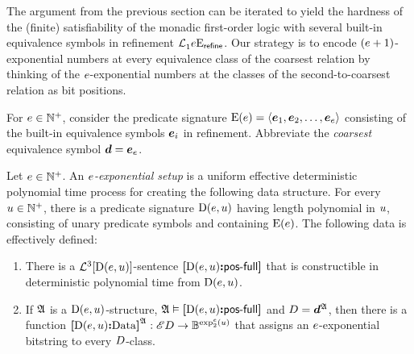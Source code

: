 The argument from the previous section can be iterated to yield the hardness of
the (finite) satisfiability of the monadic first-order logic with several
built-in equivalence symbols in refinement $\mathcal{L}^{{}}_{1}{e}\mathrm{E}_{\mathsf{refine}}$.
Our strategy is to encode $(e+1)$-exponential numbers at every equivalence
class of the coarsest relation by thinking of the $e$-exponential numbers at
the classes of the second-to-coarsest relation as bit positions.

 For $e \in \mathbb{N}^{+}$, consider the predicate
signature ${\mathrm{E}}(e) = \left\langle \bm{e}_{1},\bm{e}_{2},\dots,\bm{e}_{e} \right\rangle$ consisting of the built-in equivalence
symbols $\bm{e}_{i}$ in refinement. Abbreviate the \emph{coarsest} equivalence 
symbol $\bm{d} = \bm{e}_{e}$.
\begin{definition}
Let $e \in \mathbb{N}^{+}$. An \emph{$e$-exponential setup} is a uniform
effective deterministic polynomial time process for creating the following data
structure.
For every $u \in \mathbb{N}^{+}$, there is a predicate signature ${\mathrm{D}}(e,u)$
having length polynomial in $u$, consisting of unary predicate symbols and
containing ${\mathrm{E}}(e)$. The following data is effectively defined:
\begin{enumerate}[label=E\arabic*]
  \item\label{eset:1} There is a $\mathcal{L}^{3}[{\mathrm{D}}(e,u)]$-sentence
  ${\bm{[}{\mathrm{D}}(e,u)\mathord{\bm{:}}\mathsf{pos}{\hbox{-}}\mathsf{full}\bm{]}}$ that is constructible in deterministic polynomial
  time from ${\mathrm{D}}(e,u)$.
  
  \item\label{eset:2} If $\mathfrak{A}$ is a ${\mathrm{D}}(e,u)$-structure,
  $\mathfrak{A} \vDash {\bm{[}{\mathrm{D}}(e,u)\mathord{\bm{:}}\mathsf{pos}{\hbox{-}}\mathsf{full}\bm{]}}$ and $D = \bm{d}^{\mathfrak{A}}$, then there
  is a function
  ${\bm{[}{\mathrm{D}}(e,u)\mathord{\bm{:}}\mathrm{Data}\bm{]}}^{\mathfrak{A}} : {\mathscr{E}D} \to \mathbb{B}^{\exp_{2}^{e}(u)}$
  that assigns an $e$-exponential bitstring to every $D$-class.
  

\end{enumerate}
\end{definition}
